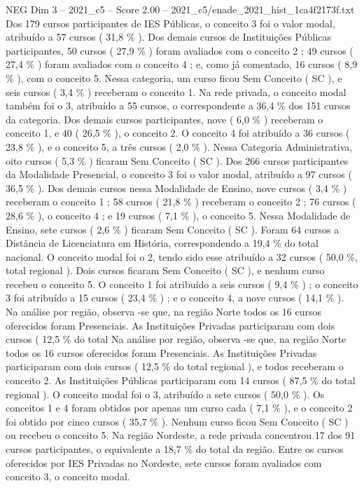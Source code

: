 \begin{textsample}{NEG Dim 3 – 2021\_c5 – Score 2.00 – 2021\_c5/enade\_2021\_hist\_1ca4f2173f.txt}
Dos 179 cursos participantes de IES Públicas, o conceito 3 foi o valor modal, atribuído a 57 cursos ( 31,8 \% ).
Dos demais cursos de Instituições Públicas participantes, 50 cursos ( 27,9 \% ) foram avaliados com o conceito 2 ; 49 cursos ( 27,4 \% ) foram avaliados com o conceito 4 ; e, como já comentado, 16 cursos ( 8,9 \% ), com o conceito 5.
Nessa categoria, um curso ficou Sem Conceito ( SC ), e seis cursos ( 3,4 \% ) receberam o conceito 1.
Na rede privada, o conceito modal também foi o 3, atribuído a 55 cursos, o correspondente a 36,4 \% dos 151 cursos da categoria.
Dos demais cursos participantes, nove ( 6,0 \% ) receberam o conceito 1, e 40 ( 26,5 \% ), o conceito 2.
O conceito 4 foi atribuído a 36 cursos ( 23,8 \% ), e o conceito 5, a três cursos ( 2,0 \% ).
Nessa Categoria Administrativa, oito cursos ( 5,3 \% ) ficaram Sem Conceito ( SC ).
Dos 266 cursos participantes da Modalidade Presencial, o conceito 3 foi o valor modal, atribuído a 97 cursos ( 36,5 \% ).
Dos demais cursos nessa Modalidade de Ensino, nove cursos ( 3,4 \% ) receberam o conceito 1 ; 58 cursos ( 21,8 \% ) receberam o conceito 2 ; 76 cursos ( 28,6 \% ), o conceito 4 ; e 19 cursos ( 7,1 \% ), o conceito 5.
Nessa Modalidade de Ensino, sete cursos ( 2,6 \% ) ficaram Sem Conceito ( SC ).
Foram 64 cursos a Distância de Licenciatura em História, correspondendo a 19,4 \% do total nacional.
O conceito modal foi o 2, tendo sido esse atribuído a 32 cursos ( 50,0 \%, total regional ).
Dois cursos ficaram Sem Conceito ( SC ), e nenhum curso recebeu o conceito 5.
O conceito 1 foi atribuído a seis cursos ( 9,4 \% ) ; o conceito 3 foi atribuído a 15 cursos ( 23,4 \% ) ; e o conceito 4, a nove cursos ( 14,1 \% ).
Na análise por região, observa -se que, na região Norte todos os 16 cursos oferecidos foram Presenciais.
As Instituições Privadas participaram com dois cursos ( 12,5 \% do total Na análise por região, observa -se que, na região Norte todos os 16 cursos oferecidos foram Presenciais.
As Instituições Privadas participaram com dois cursos ( 12,5 \% do total regional ), e todos receberam o conceito 2.
As Instituições Públicas participaram com 14 cursos ( 87,5 \% do total regional ).
O conceito modal foi o 3, atribuído a sete cursos ( 50,0 \% ).
Os conceitos 1 e 4 foram obtidos por apenas um curso cada ( 7,1 \% ), e o conceito 2 foi obtido por cinco cursos ( 35,7 \% ).
Nenhum curso ficou Sem Conceito ( SC ) ou recebeu o conceito 5.
Na região Nordeste, a rede privada concentrou 17 dos 91 cursos participantes, o equivalente a 18,7 \% do total da região.
Entre os cursos oferecidos por IES Privadas no Nordeste, sete cursos foram avaliados com conceito 3, o conceito modal.

\end{textsample}
